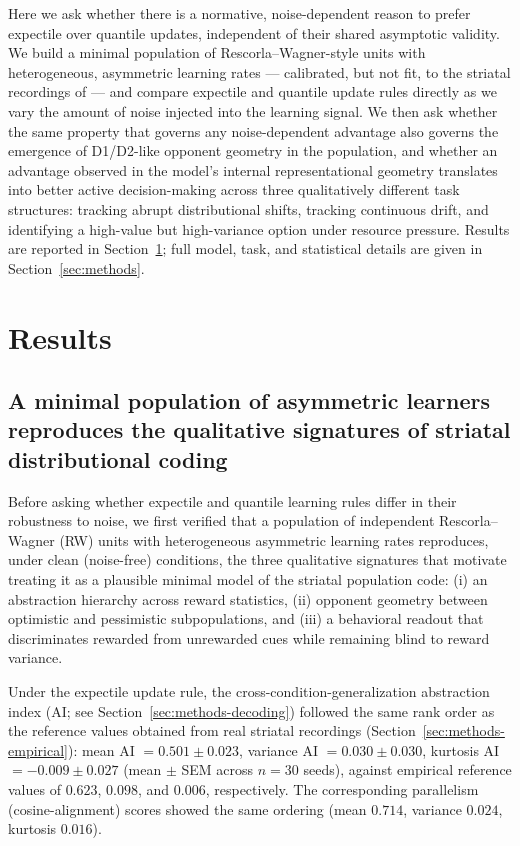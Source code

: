 \documentclass[11pt]{article}
\begin{document}
Here we ask whether there is a normative, noise-dependent reason to prefer expectile over quantile updates, independent of their shared asymptotic validity. We build a minimal population of Rescorla--Wagner-style units with heterogeneous, asymmetric learning rates --- calibrated, but not fit, to the striatal recordings of \citet{lowet2025} --- and compare expectile and quantile update rules directly as we vary the amount of noise injected into the learning signal. We then ask whether the same property that governs any noise-dependent advantage also governs the emergence of D1/D2-like opponent geometry in the population, and whether an advantage observed in the model's internal representational geometry translates into better active decision-making across three qualitatively different task structures: tracking abrupt distributional shifts, tracking continuous drift, and identifying a high-value but high-variance option under resource pressure. Results are reported in Section~\ref{sec:results}; full model, task, and statistical details are given in Section~\ref{sec:methods}.

\section{Results}
\label{sec:results}

\subsection{A minimal population of asymmetric learners reproduces the qualitative signatures of striatal distributional coding}
\label{sec:results-baseline}

Before asking whether expectile and quantile learning rules differ in their robustness to noise, we first verified that a population of independent Rescorla--Wagner (RW) units with heterogeneous asymmetric learning rates reproduces, under clean (noise-free) conditions, the three qualitative signatures that motivate treating it as a plausible minimal model of the striatal population code: (i) an abstraction hierarchy across reward statistics, (ii) opponent geometry between optimistic and pessimistic subpopulations, and (iii) a behavioral readout that discriminates rewarded from unrewarded cues while remaining blind to reward variance.

Under the expectile update rule, the cross-condition-generalization abstraction index (AI; see Section~\ref{sec:methods-decoding}) followed the same rank order as the reference values obtained from real striatal recordings (Section~\ref{sec:methods-empirical}): mean AI $= 0.501 \pm 0.023$, variance AI $= 0.030 \pm 0.030$, kurtosis AI $= -0.009 \pm 0.027$ (mean $\pm$ SEM across $n=30$ seeds), against empirical reference values of $0.623$, $0.098$, and $0.006$, respectively. The corresponding parallelism (cosine-alignment) scores showed the same ordering (mean $0.714$, variance $0.024$, kurtosis $0.016$).
\end{document}
